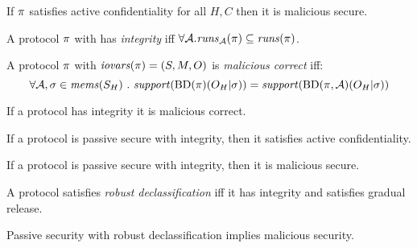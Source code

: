 \begin{theorem}
  If $\pi$ satisfies active confidentiality for all $H,C$ then it is malicious secure.
\end{theorem}

\begin{definition}
  A protocol $\pi$ with has \emph{integrity} iff 
  $\forall \mathcal{A} . \mathit{runs}_{\mathcal{A}}(\pi) \subseteq \mathit{runs}(\pi)$.
\end{definition}

\begin{definition}
  A protocol $\pi$ with $\mathit{iovars}(\pi) = (S,M,O)$ is \emph{malicious correct} iff:
  $$
  \forall \mathcal{A}, \sigma \in \mathit{mems}(S_H) \ .\ \mathit{support}(\mathrm{BD}(\pi)(O_H|\sigma)) =
    \mathit{support}(\mathrm{BD}(\pi,\mathcal{A})(O_H|\sigma))
  $$
\end{definition}

\begin{theorem}
  If a protocol has integrity it is malicious correct.
\end{theorem}

\begin{theorem}
  If a protocol is passive secure with integrity, then it satisfies active confidentiality.
\end{theorem}

\begin{theorem}
  If a protocol is passive secure with integrity, then it is malicious secure.
\end{theorem}

\begin{definition}
  A protocol satisfies \emph{robust declassification} iff it has integrity and
  satisfies gradual release. 
\end{definition}

\begin{theorem}
  Passive security with robust declassification implies malicious security.
\end{theorem}
